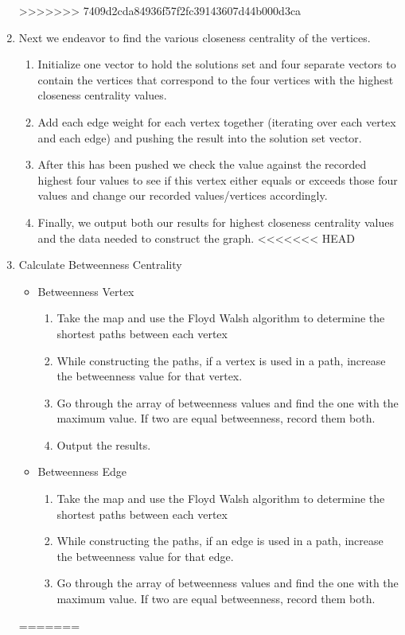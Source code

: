 \documentclass{article}
\begin{document}
\begin{enumerate}
>>>>>>> 7409d2cda84936f57f2fc39143607d44b000d3ca

    \item Next we endeavor to find the various closeness centrality of the vertices.
    \begin{enumerate}
        \item Initialize one vector to hold the solutions set and four separate vectors to contain the vertices that correspond to the four vertices with the highest closeness centrality values.
        \item Add each edge weight for each vertex together (iterating over each vertex and each edge) and pushing the result into the solution set vector.
        \item After this has been pushed we check the value against the recorded highest four values to see if this vertex either equals or exceeds those four values and change our recorded values/vertices accordingly.
        \item Finally, we output both our results for highest closeness centrality values and the data needed to construct the graph.
<<<<<<< HEAD
    \end{enumerate}

    \item Calculate Betweenness Centrality
    \begin{itemize}
        \item Betweenness Vertex
        \begin{enumerate}
            \item Take the map and use the Floyd Walsh algorithm to determine the shortest paths between each vertex
            \item While constructing the paths, if a vertex is used in a path, increase the betweenness value for that vertex.
            \item Go through the array of betweenness values and find the one with the maximum value. If two are equal betweenness, record them both.
            \item Output the results.
        \end{enumerate}

        \item Betweenness Edge
        \begin{enumerate}
            \item Take the map and use the Floyd Walsh algorithm to determine the shortest paths between each vertex
            \item While constructing the paths, if an edge is used in a path, increase the betweenness value for that edge.
            \item Go through the array of betweenness values and find the one with the maximum value. If two are equal betweenness, record them both.
        \end{enumerate}
    \end{itemize}
=======
     \end{enumerate}
     
\end{document}
